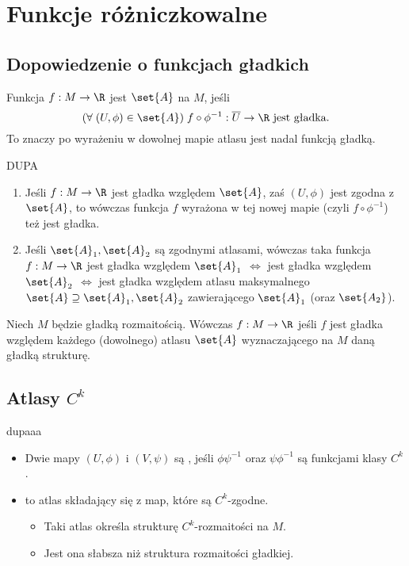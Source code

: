 
\section{Funkcje różniczkowalne}
\subsection{Dopowiedzenie o funkcjach gładkich}

\begin{definicja}
Funkcja $f:M\to \R$ jest  $\set{A}$ na $M$, jeśli
$$(\forall\;(U,\phi)\in\set{A})\;f\circ\phi^{-1}:\overline U\to \R\text{ jest gładka.}$$
To znaczy po wyrażeniu w dowolnej mapie atlasu jest nadal funkcją gładką.
\end{definicja}

\begin{fakt}{\color{back}DUPA}
    \begin{enumerate}
        \item Jeśli $f:M\to\R$ jest gładka względem $\set{A}$, zaś $(U,\phi)$ jest zgodna z $\set{A}$, to wówczas funkcja $f$ wyrażona w tej nowej mapie (czyli $f\circ\phi^{-1}$) też jest gładka.
        \item Jeśli $\set{A}_1,\set{A}_2$ są zgodnymi atlasami, wówczas taka funkcja $f:M\to\R$ jest gładka względem $\set{A}_1$ $\iff$ jest gładka względem $\set{A}_2$ $\iff$ jest gładka względem atlasu maksymalnego $\set{A}\supseteq \set{A}_1,\set{A}_2$ zawierającego $\set{A}_1$ (oraz $\set{A_2}$).
    \end{enumerate}
\end{fakt}

Niech $M$ będzie gładką rozmaitością. Wówczas $f:M\to\R$  jeśli $f$ jest gładka względem każdego (dowolnego) atlasu $\set{A}$ wyznaczającego na $M$ daną gładką strukturę.

\subsection{Atlasy $C^k$}

\begin{definicja}{\color{back}dupaaa}
    \begin{itemize}
        \item Dwie mapy $(U,\phi)$ i $(V,\psi)$ są , jeśli $\phi\psi^{-1}$ oraz $\psi\phi^{-1}$ są funkcjami klasy $C^k$.
        \item {} to atlas składający się z map, które są $C^k$-zgodne. 
        \begin{itemize}
            \item Taki atlas określa strukturę $C^k$-rozmaitości na $M$.
            \item Jest ona słabsza niż struktura rozmaitości gładkiej.
        \end{itemize}
    \end{itemize}
\end{definicja}

